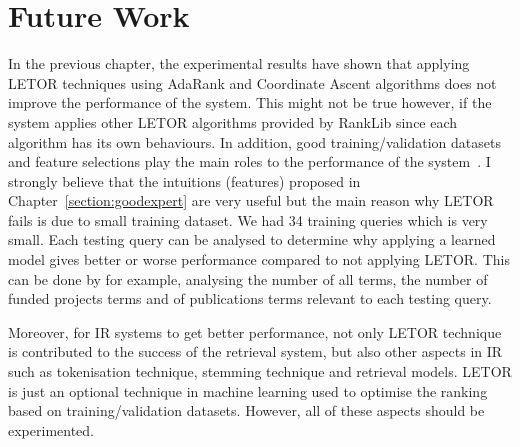 \section{Future Work}
In the previous chapter, the experimental results have shown that applying LETOR techniques using AdaRank and Coordinate Ascent algorithms 
does not improve the performance
of the system. This might not be true however, if the system applies other LETOR algorithms provided by RankLib since each algorithm has its own behaviours.
In addition, good training/validation datasets and feature selections play the main roles to the performance of the system~\cite{craig}. I strongly believe that the intuitions (features)
proposed in Chapter~\ref{section:goodexpert} are very useful but the main reason why LETOR fails is due to small training dataset. 
We had 34 training queries which is very small. Each testing query can be analysed to determine why applying a learned model gives better or worse
performance compared to not applying LETOR. This can be done by for example, analysing the number of all terms,
the number of funded projects terms and of publications terms relevant to each testing query.

Moreover, for IR systems to get better performance, not only LETOR technique is contributed to the success of the retrieval system, but also 
other aspects in IR such as tokenisation technique, stemming technique and retrieval models.
LETOR is just an optional technique in machine learning used to optimise the ranking based 
on training/validation datasets. However, all of these aspects should be experimented.
